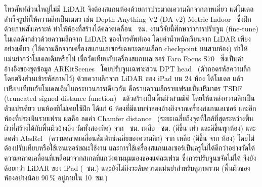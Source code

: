 \begin{thaiabstract}
โทรศัพท์ส่วนใหญ่ไม่มี LiDAR จึงต้องสแกนห้องด้วยการประมาณความลึกจากภาพเดี่ยว
แต่โมเดลสำเร็จรูปที่ให้ความลึกเป็นเมตร เช่น Depth Anything V2 (DA-v2) Metric-Indoor~\cite{da2}
ซึ่งฝึกด้วยภาพสังเคราะห์ ทำให้ห้องที่สร้างได้คลาดเคลื่อน \rsMETRICCM{}~ซม.
งานวิจัยนี้ศึกษาว่าการปรับจูน (fine-tune) โมเดลดังกล่าวด้วยความลึกจาก LiDAR ของโทรศัพท์เอง
โดยค่าน้ำหนักเรียนจาก LiDAR เพียงอย่างเดียว (ใช้ความลึกจากเครื่องสแกนเลเซอร์เฉพาะตอนเลือก checkpoint บนสามห้อง)
ทำให้แม่นยำกว่าโมเดลเดิมหรือไม่ เมื่อวัดเทียบกับเครื่องสแกนเลเซอร์
Faro Focus S70~\cite{faro} ซึ่งเป็นค่าอ้างอิงของชุดข้อมูล ARKitScenes~\cite{arkitscenes}
โดยปรับจูนเฉพาะส่วน DPT head~\cite{dpt} (ตัวถอดรหัสความลึก โดยตรึงส่วนเข้ารหัสภาพไว้)
ด้วยความลึกจาก LiDAR ของ iPad บน 24 ห้อง ได้โมเดล \ftmain{}
แล้วเปรียบเทียบกับโมเดลเดิมในกระบวนการเดียวกัน คือรวมความลึกรายเฟรมเป็นปริมาตร
TSDF (truncated signed distance function)~\cite{curless96} แล้วสร้างเป็นพื้นผิวสามมิติ
โดยให้แหล่งความลึกเป็นตัวแปรเดียว บนห้องที่ไม่เคยใช้ฝึก ได้แก่ 6 ห้องที่มีแบบจำลองอ้างอิงจากเครื่องสแกนเลเซอร์
และอีก \rsVN{} ห้องที่ประเมินรายเฟรม
ผลคือ \ftmain{} ลดค่า Chamfer distance~\cite{chamfer}
(ระยะเฉลี่ยถึงจุดที่ใกล้ที่สุดระหว่างพื้นผิวที่สร้างได้กับพื้นผิวอ้างอิง วัดทั้งสองทิศ) จาก \rsMETRICCM{}~ซม. เหลือ \rsFTLIDARALLCM{}~ซม.
(ดีขึ้น \rsMAINGAIN{} เท่า และดีขึ้นทุกห้อง) และลดค่า AbsRel~\cite{eigen14}
(ความคลาดเคลื่อนสัมพัทธ์เฉลี่ยของความลึก) จาก \rsVMETRICABSREL{} เหลือ \rsVFTALLABSREL{}
(ดีขึ้น \rsVWINS{} จาก \rsVN{} ห้อง) โดยไม่ต้องปรับเทียบหรือใช้เซนเซอร์ขณะใช้งาน
และการใช้เครื่องสแกนเลเซอร์เป็นครูไม่ได้ดีกว่าอย่างวัดได้
ความคลาดเคลื่อนที่เหลือมาจากสเกลที่แกว่งตามมุมมองของแต่ละเฟรม ซึ่งการปรับจูนขจัดไม่ได้
จึงยังด้อยกว่า LiDAR ของ iPad (\rsLIDARCM{}~ซม.) และยังไม่ถึงระดับความแม่นยำสำหรับดูภาพรวม
(พื้นผิวของห้องอย่างน้อย 90\,\% อยู่ภายใน 10~ซม.)
\end{thaiabstract}

